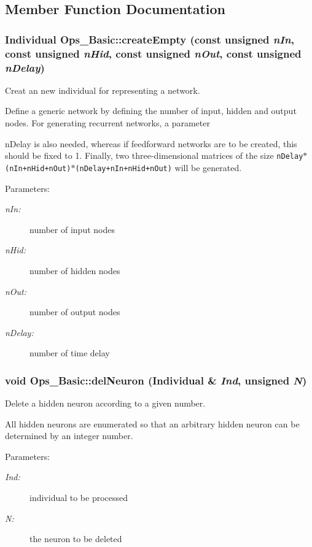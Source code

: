 \subsection{Member Function Documentation}
\subsubsection{\setlength{\rightskip}{0pt plus 5cm}Individual Ops\_\-Basic::create\-Empty (const unsigned {\em n\-In}, const unsigned {\em n\-Hid}, const unsigned {\em n\-Out}, const unsigned {\em n\-Delay})}\label{classOps__Basic_a0}


Creat an new individual for representing a network.

Define a generic network by defining the number of input, hidden and output nodes. For generating recurrent networks, a parameter \par
 n\-Delay is also needed, whereas if feedforward networks are to be created, this should be fixed to 1. Finally, two three-dimensional matrices of the size {\tt n\-Delay$\ast$(n\-In+n\-Hid+n\-Out)$\ast$(n\-Delay+n\-In+n\-Hid+n\-Out)} will be generated.\begin{Desc}
\item[Parameters: ]\par
\begin{description}
\item[{\em 
n\-In:}]number of input nodes \item[{\em 
n\-Hid:}]number of hidden nodes \item[{\em 
n\-Out:}]number of output nodes \item[{\em 
n\-Delay:}]number of time delay \end{description}
\end{Desc}
\subsubsection{\setlength{\rightskip}{0pt plus 5cm}void Ops\_\-Basic::del\-Neuron (Individual \& {\em Ind}, unsigned {\em N})\hspace{0.3cm}{\tt  [protected]}}\label{classOps__Basic_b2}


Delete a hidden neuron according to a given number.

All hidden neurons are enumerated so that an arbitrary hidden neuron can be determined by an integer number. \begin{Desc}
\item[Parameters: ]\par
\begin{description}
\item[{\em 
Ind:}]individual to be processed \item[{\em 
N:}]the neuron to be deleted \end{description}
\end{Desc}
